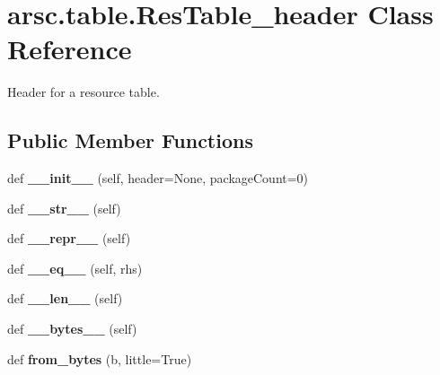 \hypertarget{classarsc_1_1table_1_1ResTable__header}{}\section{arsc.\+table.\+Res\+Table\+\_\+header Class Reference}
\label{classarsc_1_1table_1_1ResTable__header}


Header for a resource table.  


\subsection*{Public Member Functions}
\begin{DoxyCompactItemize}
\item 
\mbox{\label{classarsc_1_1table_1_1ResTable__header_a0f1ee9ea8465a28370d49ddaaa7fa083}} 
def {\bfseries \+\_\+\+\_\+init\+\_\+\+\_\+} (self, header=None, package\+Count=0)
\item 
\mbox{\label{classarsc_1_1table_1_1ResTable__header_a973a04d4ec3e1213b43ec6e0ba0a3340}} 
def {\bfseries \+\_\+\+\_\+str\+\_\+\+\_\+} (self)
\item 
\mbox{\label{classarsc_1_1table_1_1ResTable__header_a0d16c5e1b795e3113719d461b5400ac2}} 
def {\bfseries \+\_\+\+\_\+repr\+\_\+\+\_\+} (self)
\item 
\mbox{\label{classarsc_1_1table_1_1ResTable__header_a974a211f1f7afa3af2872ec2f1d12a63}} 
def {\bfseries \+\_\+\+\_\+eq\+\_\+\+\_\+} (self, rhs)
\item 
\mbox{\label{classarsc_1_1table_1_1ResTable__header_adb39b74d0689fa01753ab64c2143190c}} 
def {\bfseries \+\_\+\+\_\+len\+\_\+\+\_\+} (self)
\item 
\mbox{\label{classarsc_1_1table_1_1ResTable__header_ab11aa0d73ccc4c268006392dc18dc470}} 
def {\bfseries \+\_\+\+\_\+bytes\+\_\+\+\_\+} (self)
\item 
\mbox{\label{classarsc_1_1table_1_1ResTable__header_a9a2777829377d9380f3225725790ec2c}} 
def {\bfseries from\+\_\+bytes} (b, little=True)
\end{DoxyCompactItemize}
